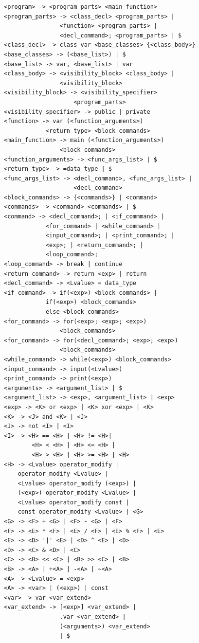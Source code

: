 \documentclass[times, utf8, zavrsni]{fer}
\begin{document}
\begin{verbatim}
<program> -> <program_parts> <main_function>
<program_parts> -> <class_decl> <program_parts> |
                <function> <program_parts> | 
                <decl_command>; <program_parts> | $
<class_decl> -> class var <base_classes> {<class_body>}
<base_classes> -> (<base_list>) | $
<base_list> -> var, <base_list> | var
<class_body> -> <visibility_block> <class_body> | 
                <visibility_block>
<visibility_block> -> <visibility_specifier> 
                    <program_parts>
<visibility_specifier> -> public | private
<function> -> var (<function_arguments>) 
            <return_type> <block_commands>
<main_function> -> main (<function_arguments>) 
                <block_commands>
<function_arguments> -> <func_args_list> | $
<return_type> -> =data_type | $
<func_args_list> -> <decl_command>, <func_args_list> |
                    <decl_command>
<block_commands> -> {<commands>} | <command>
<commands> -> <command> <commands> | $
<command> -> <decl_command>; | <if_commmand> | 
            <for_command> | <while_command> | 
            <input_command>; | <print_command>; |
            <exp>; | <return_command>; | 
            <loop_command>;
<loop_command> -> break | continue
<return_command> -> return <exp> | return
<decl_command> -> <Lvalue> = data_type
<if_command> -> if(<exp>) <block_commands> | 
            if(<exp>) <block_commands> 
            else <block_commands>
<for_command> -> for(<exp>; <exp>; <exp>)
                <block_commands>
<for_command> -> for(<decl_command>; <exp>; <exp>) 
                <block_commands>
<while_command> -> while(<exp>) <block_commands>
<input_command> -> input(<Lvalue>)
<print_command> -> print(<exp>)
<arguments> -> <argument_list> | $
<argument_list> -> <exp>, <argument_list> | <exp>
<exp> -> <K> or <exp> | <K> xor <exp> | <K>
<K> -> <J> and <K> | <J>
<J> -> not <I> | <I>
<I> -> <H> == <H> | <H> != <H>| 
        <H> < <H> | <H> <= <H> |
        <H> > <H> | <H> >= <H> | <H>
<H> -> <Lvalue> operator_modify | 
    operator_modify <Lvalue> |
    <Lvalue> operator_modify (<exp>) |
    (<exp>) operator_modify <Lvalue> |
    <Lvalue> operator_modify const | 
    const operator_modify <Lvalue> | <G>
<G> -> <F> + <G> | <F> - <G> | <F>
<F> -> <E> * <F> | <E> / <F> | <E> % <F> | <E>
<E> -> <D> '|' <E> | <D> ^ <E> | <D>
<D> -> <C> & <D> | <C>
<C> -> <B> << <C> | <B> >> <C> | <B>
<B> -> <A> | +<A> | -<A> | ~<A>
<A> -> <Lvalue> = <exp>
<A> -> <var> | (<exp>) | const
<var> -> var <var_extend>
<var_extend> -> [<exp>] <var_extend> | 
                .var <var_extend> |
                (<arguments>) <var_extend>
                | $
\end{verbatim}
\end{document}
